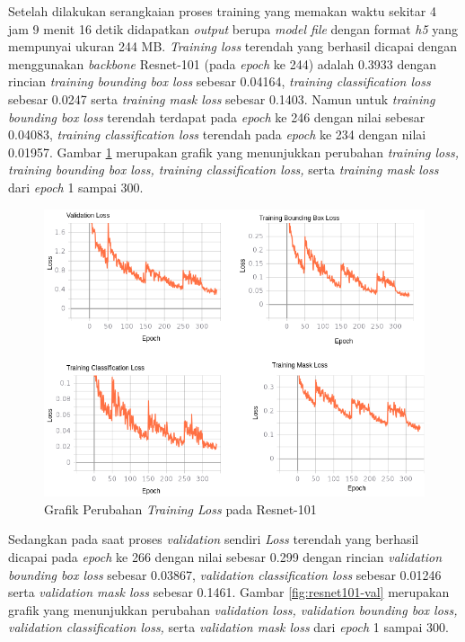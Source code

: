 Setelah dilakukan serangkaian proses training yang memakan waktu sekitar 4 jam 9 menit 16 detik didapatkan \textit{output} berupa \textit{model file}  dengan format \textit{h5} yang mempunyai ukuran 244 MB. \textit{Training loss} terendah yang berhasil dicapai dengan menggunakan \textit{backbone} Resnet-101 (pada \textit{epoch} ke 244) adalah 0.3933 dengan rincian \textit{training bounding box loss} sebesar 0.04164, \textit{training classification loss} sebesar 0.0247 serta \textit{training mask loss} sebesar 0.1403. Namun untuk \textit{training bounding box loss} terendah terdapat pada \textit{epoch} ke 246 dengan nilai sebesar 0.04083, \textit{training classification loss} terendah pada \textit{epoch} ke 234 dengan nilai 0.01957. Gambar \ref{fig:resnet101-training} merupakan grafik yang menunjukkan perubahan \textit{training loss, training bounding box loss, training classification loss,} serta \textit{training mask loss} dari \textit{epoch} 1 sampai 300. 

\begin{figure}[h]
	\centering
	\includegraphics[scale=0.36]{gambar/resnet101-training.png}
	\caption{Grafik Perubahan \textit{Training Loss} pada Resnet-101}
	\label{fig:resnet101-training}
\end{figure}

Sedangkan pada saat proses \textit{validation} sendiri \textit{Loss} terendah yang berhasil dicapai pada \textit{epoch} ke 266 dengan nilai sebesar 0.299 dengan rincian \textit{validation bounding box loss} sebesar 0.03867, \textit{validation classification loss} sebesar 0.01246 serta \textit{validation mask loss} sebesar 0.1461. Gambar \ref{fig:resnet101-val} merupakan grafik yang menunjukkan perubahan \textit{validation loss, validation bounding box loss, validation classification loss,} serta \textit{validation mask loss} dari \textit{epoch} 1 sampai 300.

